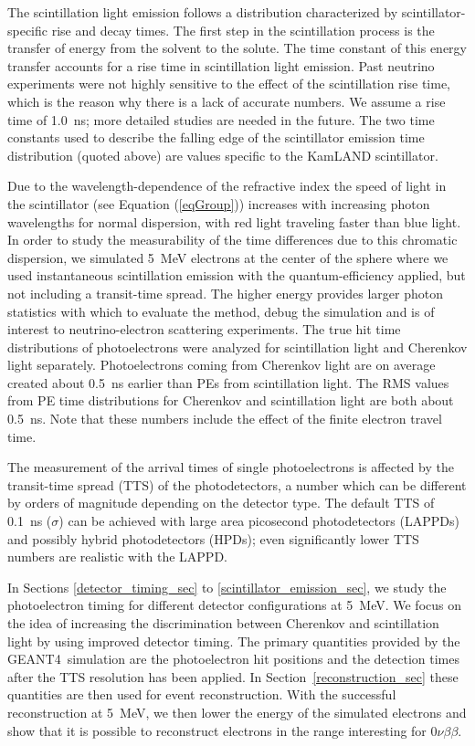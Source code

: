 \documentclass[cits]{JINST}
\newcommand{\GEANT}{GEANT4}
\begin{document}
The scintillation light emission follows a distribution characterized by
scintillator-specific rise and decay times. The first step in the scintillation process is the transfer of energy from the solvent to the solute. The time constant of this
energy transfer accounts for a rise time in scintillation light
emission. Past neutrino experiments were not highly sensitive to the
effect of the scintillation rise time, which is the reason why there
is a lack of accurate numbers. We assume a rise time of 1.0~ns; more
detailed studies are needed in the future. The two time constants used
to describe the falling edge of the scintillator emission time
distribution (quoted above) are values specific to the KamLAND
scintillator.

Due to the wavelength-dependence of the refractive index the speed of
light in the scintillator (see Equation (\ref{eqGroup})) increases
with increasing photon wavelengths for normal dispersion, with red
light traveling faster than blue light.  In order to study the
measurability of the time differences due to this chromatic dispersion, we simulated 5~MeV electrons at
the center of the sphere where we used instantaneous scintillation
emission with the quantum-efficiency applied, but not including a
transit-time spread. The higher energy provides larger photon statistics with which to evaluate the method, debug the simulation and is of interest to neutrino-electron scattering experiments. The true hit time distributions of photoelectrons
were analyzed for scintillation light and Cherenkov light
separately. Photoelectrons coming from Cherenkov light are on average
created about 0.5~ns earlier than PEs from scintillation light. The
RMS values from PE time distributions for Cherenkov and scintillation
light are both about 0.5~ns. Note that these numbers include the
effect of the finite electron travel time.

The measurement of the arrival times of single photoelectrons is
affected by the transit-time spread (TTS) of the photodetectors, a
number which can be different by orders of magnitude depending on the
detector type. The default TTS of 0.1~ns ($\sigma$) can be achieved with large area picosecond photodetectors
(LAPPDs)\cite{Adams:2013nva,RSI_paper,PSEC4_paper,anode_paper} and possibly hybrid photodetectors
(HPDs)\cite{hpdThesis}; even significantly lower TTS numbers are
realistic with the LAPPD\cite{RSI_paper,PSEC4_paper,anode_paper}.

In Sections \ref{detector_timing_sec} to
\ref{scintillator_emission_sec}, we study the
photoelectron timing for different detector configurations at 5~MeV. We focus
on the idea of increasing the discrimination between Cherenkov and
scintillation light by using improved detector timing. The primary
quantities provided by the \GEANT~simulation are the photoelectron hit
positions and the detection times after the TTS resolution has been
applied. In Section~\ref{reconstruction_sec} these quantities are then
used for event reconstruction. With the successful reconstruction at 5~MeV, we then lower the energy of the simulated electrons and show that it is possible to reconstruct electrons in the range interesting for $0\nu\beta\beta$.
\end{document}
